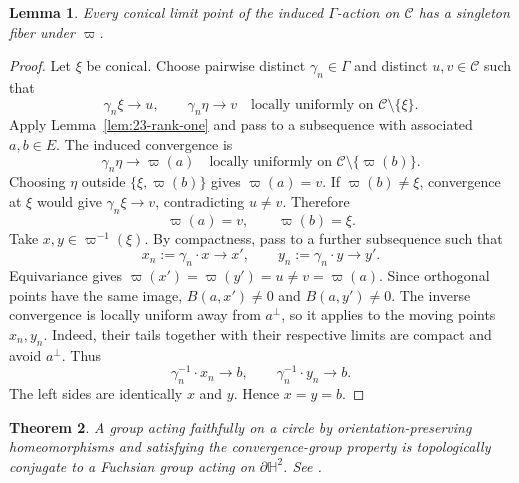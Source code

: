 \documentclass[11pt,reqno]{amsart}
\theoremstyle{plain}
\newtheorem{theorem}{Theorem}[section]
\newtheorem{lemma}[theorem]{Lemma}
\theoremstyle{definition}
\theoremstyle{remark}
\numberwithin{equation}{section}
\begin{document}
\begin{lemma}\label{lem:23-conical-fibers}
Every conical limit point of the induced $\Gamma$-action on $\mathcal C$ has a singleton fiber under $\varpi$.
\end{lemma}
\begin{proof}
Let $\xi$ be conical. Choose pairwise distinct $\gamma_n\in\Gamma$ and distinct $u,v\in\mathcal C$ such that
\[
\gamma_n\xi\longrightarrow u,\qquad
\gamma_n\eta\longrightarrow v\quad\text{locally uniformly on }
\mathcal C\setminus\{\xi\}.
\]
Apply Lemma~\ref{lem:23-rank-one} and pass to a subsequence with associated $a,b\in E$. The induced convergence is
\[
\gamma_n\eta\longrightarrow\varpi(a)\quad\text{locally uniformly on }
\mathcal C\setminus\{\varpi(b)\}.
\]
Choosing $\eta$ outside $\{\xi,\varpi(b)\}$ gives $\varpi(a)=v$. If $\varpi(b)\neq\xi$, convergence at $\xi$ would give $\gamma_n\xi\to v$, contradicting $u\neq v$. Therefore
\begin{equation}\label{eq:23-conical-images}
\varpi(a)=v,\qquad\varpi(b)=\xi.
\end{equation}
Take $x,y\in\varpi^{-1}(\xi)$. By compactness, pass to a further subsequence such that
\[
x_n:=\gamma_n\cdot x\longrightarrow x',\qquad
y_n:=\gamma_n\cdot y\longrightarrow y'.
\]
Equivariance gives $\varpi(x')=\varpi(y')=u\neq v=\varpi(a)$. Since orthogonal points have the same image, $B(a,x')\neq0$ and $B(a,y')\neq0$. The inverse convergence is locally uniform away from $a^\perp$, so it applies to the moving points $x_n,y_n$. Indeed, their tails together with their respective limits are compact and avoid $a^\perp$. Thus
\[
\gamma_n^{-1}\cdot x_n\longrightarrow b,\qquad
\gamma_n^{-1}\cdot y_n\longrightarrow b.
\]
The left sides are identically $x$ and $y$. Hence $x=y=b$.
\end{proof}

\begin{theorem}\label{thm:gabai}
A group acting faithfully on a circle by orientation-preserving homeomorphisms and satisfying the convergence-group property is topologically conjugate to a Fuchsian group acting on $\partial\mathbb H^2$. See \cite{Gabai1992}.
\end{theorem}
\end{document}

